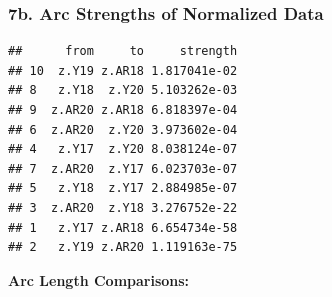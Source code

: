 \documentclass[
]{article}
\newenvironment{Shaded}{\begin{snugshade}}{\end{snugshade}}
\newcommand{\AttributeTok}[1]{\textcolor[rgb]{0.13,0.29,0.53}{#1}}
\newcommand{\CommentTok}[1]{\textcolor[rgb]{0.56,0.35,0.01}{\textit{#1}}}
\newcommand{\FunctionTok}[1]{\textcolor[rgb]{0.13,0.29,0.53}{\textbf{#1}}}
\newcommand{\NormalTok}[1]{#1}
\newcommand{\OtherTok}[1]{\textcolor[rgb]{0.56,0.35,0.01}{#1}}
\newcommand{\SpecialCharTok}[1]{\textcolor[rgb]{0.81,0.36,0.00}{\textbf{#1}}}
\newcommand{\StringTok}[1]{\textcolor[rgb]{0.31,0.60,0.02}{#1}}
\begin{document}
\subsubsection{7b. Arc Strengths of Normalized
Data}\label{b.-arc-strengths-of-normalized-data}

\begin{Shaded}
\end{Shaded}

\begin{verbatim}
##      from     to     strength
## 10  z.Y19 z.AR18 1.817041e-02
## 8   z.Y18  z.Y20 5.103262e-03
## 9  z.AR20 z.AR18 6.818397e-04
## 6  z.AR20  z.Y20 3.973602e-04
## 4   z.Y17  z.Y20 8.038124e-07
## 7  z.AR20  z.Y17 6.023703e-07
## 5   z.Y18  z.Y17 2.884985e-07
## 3  z.AR20  z.Y18 3.276752e-22
## 1   z.Y17 z.AR18 6.654734e-58
## 2   z.Y19 z.AR20 1.119163e-75
\end{verbatim}

\textbf{Arc Length Comparisons:}
\end{document}
